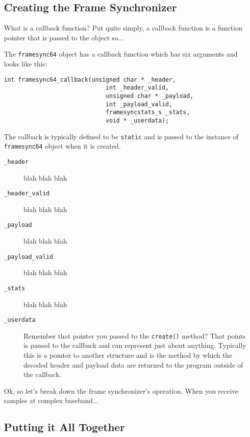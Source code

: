 %
%
\subsection{Creating the Frame Synchronizer}
\label{tutorial:framing:framesync}

What is a callback function?
Put quite simply, a callback function is a function pointer that is
passed to the object so...

The {\tt framesync64} object has a callback function which has six
arguments and looks like this:
%
\begin{Verbatim}[fontsize=\small]
    int framesync64_callback(unsigned char * _header,
                             int _header_valid,
                             unsigned char * _payload,
                             int _payload_valid,
                             framesyncstats_s _stats,
                             void * _userdata);
\end{Verbatim}
%
The callback is typically defined to be {\tt static} and is passed to
the instance of {\tt framesync64} object when it is created.
%
\begin{description}
\item[{\tt \_header}]
    blah blah blah
\item[{\tt \_header\_valid}]
    blah blah blah
\item[{\tt \_payload}]
    blah blah blah
\item[{\tt \_payload\_valid}]
    blah blah blah
\item[{\tt \_stats}]
    blah blah blah
\item[{\tt \_userdata}]
    Remember that pointer you passed to the {\tt create()} method?
    That points is passed to the callback and can represent just about
    anything.
    Typically this is a pointer to another structure and is the method
    by which the decoded header and payload data are returned to the
    program outside of the callback.
\end{description}

Ok, so let's break down the frame synchronizer's operation.
When you receive samples at complex baseband...


%
%
\subsection{Putting it All Together}
\label{tutorial:framing:xxx}



